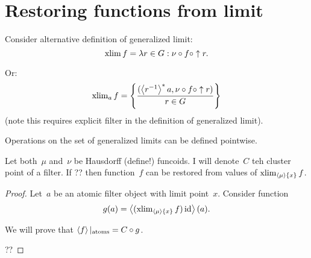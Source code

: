 \section{Restoring functions from limit}

Consider alternative definition of generalized limit:
\[ \operatorname{xlim} f = \lambda r\in G: \nu\circ f\circ\uparrow r. \]

Or:
\[ \operatorname{xlim}_a f = \left\{ \frac{(\left\langle r^{-1}\right\rangle ^{\ast}a, \nu\circ f\circ\uparrow r)}{r\in G}\right\} \]
(note this requires explicit filter in the definition of generalized limit).

Operations on the set of generalized limits can be defined pointwise.

\begin{thm}
Let both~$\mu$ and~$\nu$ be Hausdorff (define!) funcoids.
I will denote~$C$ teh cluster point of a filter.
If ?? then function~$f$ can be restored from values of $\operatorname{xlim}_{\left\langle \mu\right\rangle\{x\}}f$.
\end{thm}

\begin{proof}
Let~$a$ be an atomic filter object with limit point~$x$.
Consider function
\[ g(a)=\left\langle (\operatorname{xlim}_{\left\langle \mu\right\rangle\{x\}}f)\operatorname{id}\right\rangle(a). \]

We will prove that $\left\langle f\right\rangle|_{\operatorname{atoms}}=C\circ g$.

??
\end{proof}